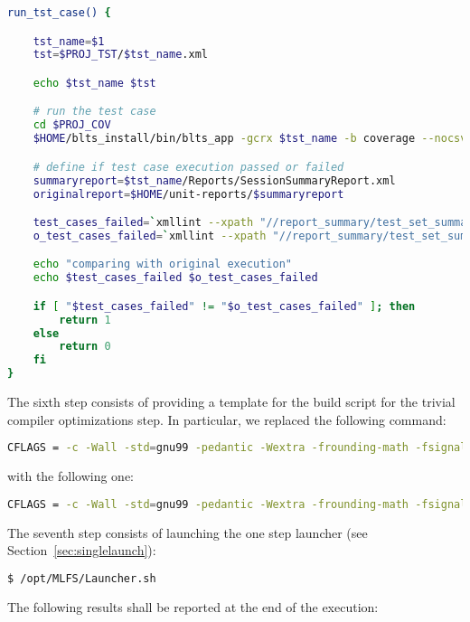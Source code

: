 \begin{lstlisting}[language=bash, label=mutation_additional, caption='run\_tst\_case' Bash function for the MLFS. Excerpt of mutation\_additional\_functions.sh file.]
run_tst_case() {

    tst_name=$1
    tst=$PROJ_TST/$tst_name.xml

    echo $tst_name $tst

    # run the test case
    cd $PROJ_COV
    $HOME/blts_install/bin/blts_app -gcrx $tst_name -b coverage --nocsv -s $tst

    # define if test case execution passed or failed
    summaryreport=$tst_name/Reports/SessionSummaryReport.xml
    originalreport=$HOME/unit-reports/$summaryreport

    test_cases_failed=`xmllint --xpath "//report_summary/test_set_summary/test_cases_failed/text()" $summaryreport`
    o_test_cases_failed=`xmllint --xpath "//report_summary/test_set_summary/test_cases_failed/text()" $originalreport`

    echo "comparing with original execution" 
    echo $test_cases_failed $o_test_cases_failed 

    if [ "$test_cases_failed" != "$o_test_cases_failed" ]; then
        return 1
    else
        return 0
    fi
}
\end{lstlisting}

The sixth step consists of providing a template for the build script for the trivial compiler optimizations step. In particular, we replaced the following command: 

\begin{lstlisting}[language=bash]
CFLAGS = -c -Wall -std=gnu99 -pedantic -Wextra -frounding-math -fsignaling-nans -g O2 -fno-builtin $(EXTRA_CFLAGS)
\end{lstlisting}

with the following one:

\begin{lstlisting}[language=bash]
CFLAGS = -c -Wall -std=gnu99 -pedantic -Wextra -frounding-math -fsignaling-nans TCE -fno-builtin $(EXTRA_CFLAGS)
\end{lstlisting}

The seventh step consists of launching the one step launcher (see Section~\ref{sec:singlelaunch}):

\begin{lstlisting}[language=bash]
 $ /opt/MLFS/Launcher.sh
\end{lstlisting}

The following results shall be reported at the end of the execution:

